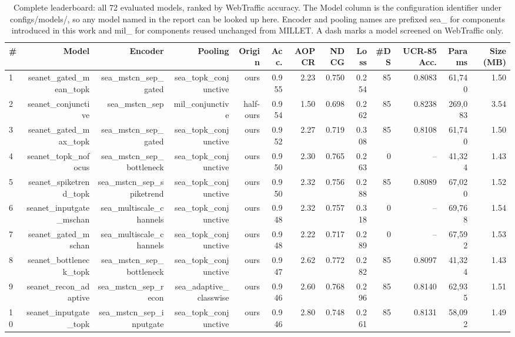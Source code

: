 \begin{table}[t]
\centering
\small
\caption{Complete leaderboard: all 72 evaluated models, ranked by WebTraffic accuracy. The Model column is the configuration identifier under configs/models/, so any model named in the report can be looked up here. Encoder and pooling names are prefixed sea\_ for components introduced in this work and mil\_ for components reused unchanged from MILLET. A dash marks a model screened on WebTraffic only.}
\label{tab:full_leaderboard}
\begin{tabular}{lrrrrrrrrrrrr}
\toprule
\# & Model & Encoder & Pooling & Origin & Acc. & AOPCR & NDCG & Loss & \#DS & UCR-85 Acc. & Params & Size (MB) \\
\midrule
1 & seanet\_gated\_mean\_topk & sea\_mstcn\_sep\_gated & sea\_topk\_conjunctive & ours & 0.955 & 2.23 & 0.750 & 0.254 & 85 & 0.8083 & 61,740 & 1.50 \\
2 & seanet\_conjunctive & sea\_mstcn\_sep & mil\_conjunctive & half-ours & 0.954 & 1.50 & 0.698 & 0.262 & 85 & 0.8238 & 269,083 & 3.54 \\
3 & seanet\_gated\_max\_topk & sea\_mstcn\_sep\_gated & sea\_topk\_conjunctive & ours & 0.952 & 2.27 & 0.719 & 0.308 & 85 & 0.8108 & 61,740 & 1.50 \\
4 & seanet\_topk\_nofocus & sea\_mstcn\_sep\_bottleneck & sea\_topk\_conjunctive & ours & 0.950 & 2.30 & 0.765 & 0.263 & 0 & -- & 41,324 & 1.43 \\
5 & seanet\_spiketrend\_topk & sea\_mstcn\_sep\_spiketrend & sea\_topk\_conjunctive & ours & 0.950 & 2.32 & 0.756 & 0.288 & 85 & 0.8089 & 67,020 & 1.52 \\
6 & seanet\_inputgate\_mschan & sea\_multiscale\_channels & sea\_topk\_conjunctive & ours & 0.948 & 2.32 & 0.757 & 0.318 & 0 & -- & 69,768 & 1.54 \\
7 & seanet\_gated\_mschan & sea\_multiscale\_channels & sea\_topk\_conjunctive & ours & 0.948 & 2.22 & 0.717 & 0.289 & 0 & -- & 67,592 & 1.53 \\
8 & seanet\_bottleneck\_topk & sea\_mstcn\_sep\_bottleneck & sea\_topk\_conjunctive & ours & 0.947 & 2.62 & 0.772 & 0.282 & 85 & 0.8097 & 41,324 & 1.43 \\
9 & seanet\_recon\_adaptive & sea\_mstcn\_sep\_recon & sea\_adaptive\_classwise & ours & 0.946 & 2.60 & 0.768 & 0.296 & 85 & 0.8140 & 62,935 & 1.51 \\
10 & seanet\_inputgate\_topk & sea\_mstcn\_sep\_inputgate & sea\_topk\_conjunctive & ours & 0.946 & 2.80 & 0.748 & 0.261 & 85 & 0.8131 & 58,092 & 1.49 \\

\end{tabular}
\end{table}
